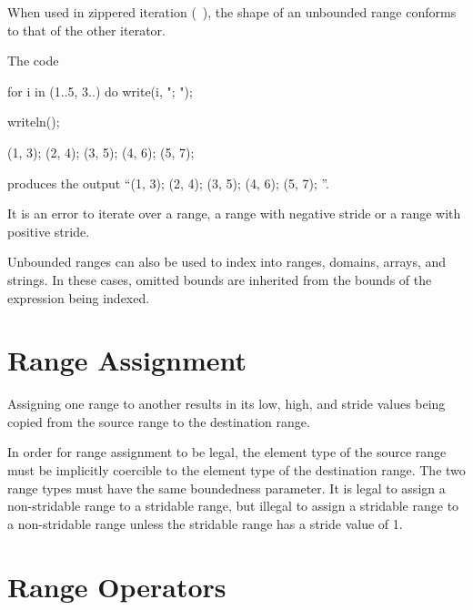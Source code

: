 When used in zippered iteration (~), the shape of an
unbounded range conforms to that of the other iterator.

\begin{example}
The code
\begin{chapelpre}
\end{chapelpre}
\begin{chapel}
for i in (1..5, 3..) do
  write(i, "; ");
\end{chapel}
\begin{chapelpost}
writeln();
\end{chapelpost}
\begin{chapeloutput}
(1, 3); (2, 4); (3, 5); (4, 6); (5, 7); 
\end{chapeloutput}
produces the output ``(1, 3); (2, 4); (3, 5); (4, 6); (5, 7); ''.
\end{example}

It is an error to iterate over a  range,
a  range with negative stride or a
 range with positive stride.

Unbounded ranges can also be used to index into ranges, domains,
arrays, and strings.  In these cases, omitted bounds are inherited
from the bounds of the expression being indexed.


\section{Range Assignment}
\label{Range_Assignment}

Assigning one range to another results in its low, high, and stride
values being copied from the source range to the destination range.

In order for range assignment to be legal, the element type of the
source range must be implicitly coercible to the element type of the
destination range.  The two range types must have the same boundedness
parameter.  It is legal to assign a non-stridable range to a stridable
range, but illegal to assign a stridable range to a non-stridable
range unless the stridable range has a stride value of 1.


\section{Range Operators}
\label{Range_Operators}

